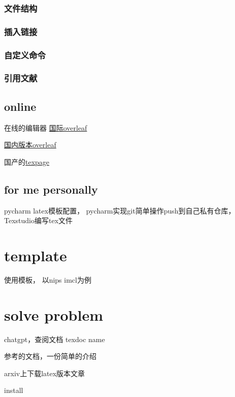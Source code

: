\documentclass[11pt]{ctexart}
\begin{document}
 \subsubsection{文件结构}
 
 \subsubsection{插入链接}
 
 \subsubsection{自定义命令}
 
 \subsubsection{引用文献}
 
 \subsection{online}
 
 在线的编辑器 \href{www.overleaf.com}{国际overleaf}
 
 \href{cn.overleaf.com}{国内版本overleaf}
 
 国产的\href{www.texpage.com}{texpage}
 
 
 \subsection{for me personally}
 
 pycharm latex模板配置， pycharm实现git简单操作push到自己私有仓库，Texstudio编写tex文件
 
 \section{template}

使用模板， 以nips imcl为例\cite{kaelbling1996reinforcement}


\section{solve problem}

 chatgpt，查阅文档  texdoc name\cite{lecun2015deep}

参考的文档，一份简单的介绍\cite{de2019causal}

arxiv上下载latex版本文章\cite{wen2020fighting}

install
\end{document}

